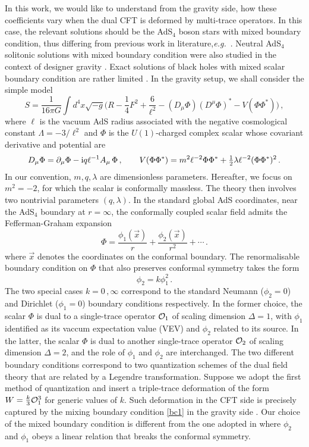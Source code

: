 \documentclass[11pt]{article}
\newcommand{\be}{\begin{equation}}
\newcommand{\ee}{\end{equation}}
\def\ft#1#2{{\textstyle{\frac{\scriptstyle #1}{\scriptstyle #2} } }}
\def\fft#1#2{{\frac{#1}{#2}}}
\begin{document}
In this work, we would like to understand from the gravity side, how these coefficients vary when the dual CFT is deformed by multi-trace operators. In this case, the relevant solutions should be the AdS$_4$ boson stars with mixed boundary condition, thus differing from previous work in literature,{\it e.g.}~\cite{delaFuente:2020yua,Liu:2020uaz,
Gentle:2011kv,Astefanesei:2003qy,Hu:2012dx,Hartmann:2012gw,Buchel:2013uba,Dias:2016pma,Arias:2016aig,rotatingbs1}. Neutral AdS$_4$ solitonic solutions with mixed boundary condition were also studied in the context of designer gravity \cite{Hertog:2004ns}. Exact solutions of black holes with mixed scalar boundary condition are rather limited \cite{Lu:2013ura}. In the gravity setup, we shall consider the simple model
\be
S=\frac{1}{16\pi G}\int d^4x\sqrt{-g}\Big(R - \ft14 F^2 +\fft{6}{\ell^2}- (D_\mu \Phi) (D^\mu \Phi)^* - V(\Phi\Phi^*)\Big)\label{genlag}\,,
\ee
where $\ell$ is the vacuum AdS radius associated with the negative cosmological constant $\Lambda=-3/\ell^2$ and $\Phi$ is the $U(1)$-charged complex scalar whose covariant derivative and potential are
\be
D_\mu \Phi=\partial_\mu\Phi-{\rm i}q \ell^{-1} A_\mu\, \Phi\,,\qquad V(\Phi\Phi^*)=m^2 \ell^{-2}\Phi\Phi^*+\ft12\lambda \ell^{-2} (\Phi\Phi^*)^2\,.
\ee
In our convention, $m, q, \lambda$ are dimensionless parameters. Hereafter, we focus on $m^2=-2$, for which the scalar is conformally massless.  The theory then involves two nontrivial parameters $(q,\lambda)$. In the standard global AdS coordinates, near the AdS$_4$ boundary at $r=\infty$, the conformally coupled scalar field admits the Fefferman-Graham expansion
\be
\Phi=\frac{\phi_1(\vec{x})}r+\frac{\phi_2(\vec{x})}{r^2}+\cdots\,.
\ee
where $\vec{x}$ denotes the coordinates on the conformal boundary.
The renormalisable boundary condition on $\Phi$ that also preserves conformal symmetry takes the form
\be
\label{bc1}
\phi_2=k\phi_1^2\,.
\ee
The two special cases $k=0\,,\infty$ correspond to the standard Neumann ($\phi_2=0$) and Dirichlet ($\phi_1=0$) boundary conditions respectively. In the former choice, the scalar $\Phi$ is dual to a single-trace operator ${\cal O}_1$ of scaling dimension $\Delta=1$, with $\phi_1$ identified as its vaccum expectation value (VEV) and $\phi_2$ related to its source. In the latter, the scalar $\Phi$ is dual to another single-trace operator ${\cal O}_2$ of scaling dimension $\Delta=2$, and the role of $\phi_1$ and $\phi_2$ are interchanged. The two different boundary conditions correspond to two quantization schemes of the dual field theory that are related by a Legendre
transformation. Suppose we adopt the first method of quantization and insert a triple-trace deformation of the form $W=\ft{k}3{\cal O}_1^3$ for generic values of $k$. Such deformation in the CFT side is precisely captured by the mixing boundary condition \eqref{bc1} in the gravity side \cite{Witten:2001ua}. Our choice of the mixed boundary condition is different from the one adopted in \cite{Gentle:2011kv} where $\phi_2$ and $\phi_1$ obeys a linear relation that breaks the conformal symmetry.
\end{document}

